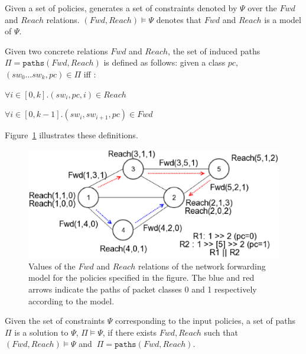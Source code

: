 Given a set of policies, \name generates a set of constraints
denoted by $\Psi$ over the $Fwd$ and $Reach$ relations. 
$(Fwd,Reach) \models \Psi$ denotes that 
$Fwd$ and $Reach$ is a model of $\Psi$.

\begin{mydef} \label{def:Pi}
Given two concrete relations $Fwd$ and $Reach$, 
the set of induced paths $\Pi = \texttt{paths}(Fwd, Reach)$ is defined as follows:
given a class $pc$,  $(sw_0 \ldots sw_k, pc) \in \Pi$ iff : 
\begin{compactenumerate}
	\item $\forall i \in [0,k]. (sw_i, pc, i) \in Reach$
	\item $\forall i \in [0, k - 1]. (sw_i, sw_{i+1}, pc) \in Fwd$
\end{compactenumerate}
\end{mydef}
\noindent Figure~\ref{fig:model} illustrates these definitions.

\begin{figure}
	\centering
	\includegraphics[width=0.8\columnwidth]{figures/network-model-example.eps}
	\caption{Values of the $Fwd$ and $Reach$ relations of the network forwarding model
		 for the policies specified in the figure. The blue and red arrows indicate the 
		 paths of packet classes 0 and 1 respectively according to the model.}
	\label{fig:model}
\end{figure}

\begin{mydef}
Given the set of constraints $\Psi$ corresponding to the input policies,
a set of paths $\Pi$ is a solution to $\Psi$, $\Pi \models \Psi$, 
if there exists $Fwd, Reach$ such that $(Fwd, Reach) \models \Psi$ and $\ \Pi=\texttt{paths}(Fwd,Reach)$.

\end{mydef}

